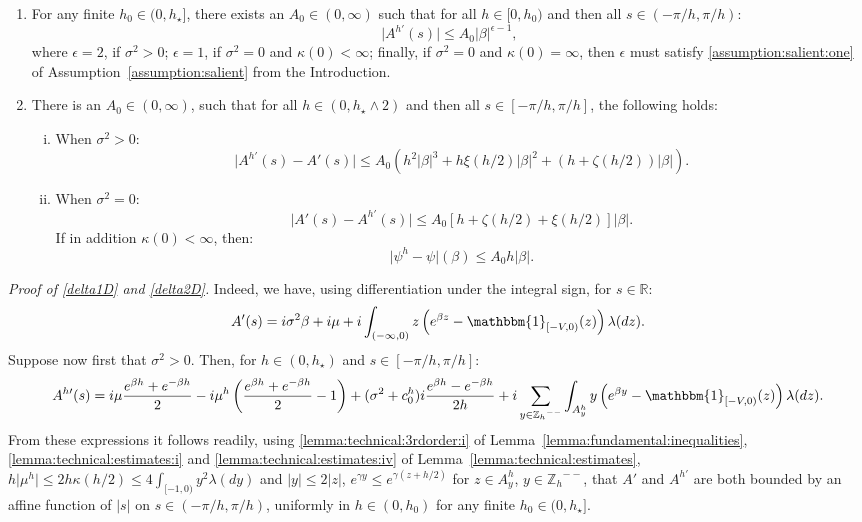 \documentclass[pdftex,oneside,11pt,reqno]{amsart}
\theoremstyle{definition}
\theoremstyle{theorem}
\theoremstyle{remark}
\numberwithin{equation}{section}
\numberwithin{definition}{section}
\begin{document}
\begin{enumerate}[label=($\Delta^{\prime}_\arabic{*}$),ref=($\Delta^{\prime}_\arabic{*}$)]
\item\label{delta1D} For any finite $h_0\in  (0,h_\star]$, there exists an $A_0\in (0,\infty)$ such that for all $h\in [0,h_0)$ and then all $s\in (-\pi/h,\pi/h)$: $$\vert A^{h\prime}(s)\vert\leq A_0\vert \beta\vert^{\epsilon-1},$$ where $\epsilon=2$, if ${\sigma^2}>0$; $\epsilon=1$, if ${\sigma^2}=0$ and $\kappa(0)<\infty$; finally, if ${\sigma^2}=0$ and $\kappa(0)=\infty$, then $\epsilon$ must satisfy \ref{assumption:salient:one} of Assumption~\ref{assumption:salient} from the Introduction. 
\item\label{delta2D} There is an $A_0\in (0,\infty)$, such that for all $h\in (0,h_\star\land 2)$ and then all $s\in [-\pi/h,\pi/h]$, the following holds:
\begin{enumerate}[(i)]
\item When ${\sigma^2}>0$: $$\vert A^{h\prime}(s)-A'(s)\vert\leq A_0(h^2\vert \beta\vert^3+h\xi(h/2)\vert \beta\vert^2+(h+\zeta(h/2))\vert \beta\vert).$$ 
\item When ${\sigma^2}=0$: $$\vert A'(s)-A^{h\prime}(s)\vert\leq A_0\left[h+\zeta(h/2)+\xi(h/2)\right]\vert \beta\vert.$$ If in addition $\kappa(0)<\infty$, then: $$\vert \psi^h-\psi\vert(\beta)\leq A_0h\vert \beta\vert.$$ 
\end{enumerate}
\end{enumerate}
\noindent \emph{Proof of \ref{delta1D} and \ref{delta2D}.}
Indeed, we have, using differentiation under the integral sign, for $s\in \mathbb{R}$: 
\begin{equation}\label{eq:FV:derivative_of_A}
A'(s)=i{\sigma^2} \beta+i{\mu}+i\int_{(-\infty,0)}z\left(e^{\beta z}-{\mathbbm{1}_{[-V,0)}}(z)\right){\lambda}(dz).
\end{equation}
Suppose now first that ${\sigma^2}>0$. Then, for $h\in (0,h_\star)$ and $s\in [-\pi/h,\pi/h]$:
\footnotesize
\begin{equation*}
A^{h\prime}(s)=i{\mu}\frac{e^{\beta h}+e^{-\beta h}}{2}-i{\mu}^h\left(\frac{e^{\beta h}+e^{-\beta h}}{2}-1\right)+({\sigma^2}+c_0^h)i\frac{e^{\beta h}-e^{-\beta h}}{2h}+i\sum_{y\in {\mathbb{Z}_h}^{--}}\int_{A_y^h}y\left(e^{\beta y}-{\mathbbm{1}_{[-V,0)}}(z)\right){\lambda}(dz).
\end{equation*}
\normalsize
From these expressions it follows readily, using \ref{lemma:technical:3rdorder:i} of Lemma~\ref{lemma:fundamental:inequalities}, \ref{lemma:technical:estimates:i} and \ref{lemma:technical:estimates:iv} of Lemma~\ref{lemma:technical:estimates}, $h\vert \mu^h\vert\leq 2h\kappa(h/2)\leq 4\int_{[-1,0)}y^2{\lambda}(dy)$  and $\vert y\vert \leq 2\vert z\vert$, $e^{\gamma y}\leq e^{\gamma(z+h/2)}$ for $z\in A_y^h$, $y\in {\mathbb{Z}_h}^{--}$, that $A'$ and $A^{h\prime}$ are both bounded by an affine function of $\vert s\vert$ on $s\in (-\pi/h,\pi/h)$, uniformly in $h\in (0,h_0)$ for any finite $h_0\in (0,h_\star]$. 
\end{document}
